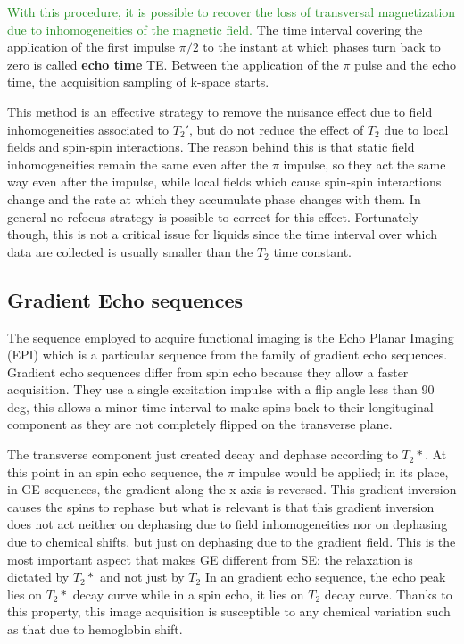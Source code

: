 \documentclass[11pt]{report}
\begin{document}
\textcolor{ForestGreen}{
With this procedure, it is possible to recover the loss of transversal magnetization due to inhomogeneities of the magnetic field.
}
The time interval covering the application of the first impulse $\pi/2$ to the instant at which phases turn back to zero is called \textbf{echo time} TE.
Between the application of the $\pi$ pulse and the echo time, the acquisition sampling of k-space starts.


This method is an effective strategy to remove the nuisance effect due to field inhomogeneities associated to $T_2'$, but do not reduce the effect of $T_2$ due to local fields and spin-spin interactions. The reason behind this is that static field inhomogeneities remain the same even after the $\pi$ impulse, so they act the same way even after the impulse, while local fields which cause spin-spin interactions change and the rate at which they accumulate phase changes with them. In general no refocus strategy is possible to correct for this effect.
Fortunately though, this is not a critical issue for liquids since the time interval over which data are collected is usually smaller than the $T_2$ time constant.



\subsection{Gradient Echo sequences}
The sequence employed to acquire functional imaging is the Echo Planar Imaging (EPI) which is a particular sequence from the family of gradient echo sequences.
Gradient echo sequences differ from spin echo because they allow a faster acquisition.
They use a single excitation impulse with a flip angle less than 90 deg, this allows a minor time interval to make spins back to their longituginal component as they are not completely flipped on the transverse plane.

The transverse component just created decay and dephase according to $T_2*$.
At this point in an spin echo sequence, the $\pi$ impulse would be applied; in its place, in GE sequences, the gradient along the x axis is reversed.
This gradient inversion causes the spins to rephase but what is relevant is that this gradient inversion does not act neither on dephasing due to field inhomogeneities nor on dephasing due to chemical shifts, but just on dephasing due to the gradient field.
This is the most important aspect that makes GE different from SE: the relaxation is dictated by $T_2*$ and not just by $T_2$
In an gradient echo sequence, the echo peak lies on $T_2*$ decay curve while in a spin echo, it lies on $T_2$ decay curve.
Thanks to this property, this image acquisition is susceptible to any chemical variation such as that due to hemoglobin shift.
\end{document}
